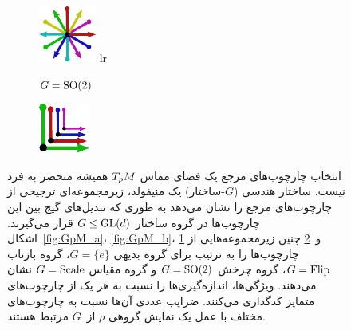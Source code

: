 \begin{figure}[htbp]
\begin{subfigure}[b]{0.24\textwidth}
		\includegraphics[width=0.8\linewidth]{figures/GpM_SO2.pdf}
		lr{\caption{\small $G=\operatorname{SO}(2)$}}
		\label{fig:GpM_c}
	\end{subfigure}
	\hspace*{.5em}
	\begin{subfigure}[b]{0.24\textwidth}
		\centering
		\includegraphics[width=0.8\linewidth]{figures/GpM_scale.pdf}
		\label{fig:GpM_d}
	\end{subfigure}
	
	\caption{
		انتخاب چارچوب‌های مرجع یک فضای مماس $T_p M$ همیشه منحصر به فرد نیست.
		ساختار هندسی ($G$-ساختار) یک منیفولد، زیرمجموعه‌ای ترجیحی از چارچوب‌های مرجع را نشان می‌دهد به طوری که تبدیل‌های گیج بین این چارچوب‌ها در گروه ساختار $G\leq\operatorname{GL}(d)$ قرار می‌گیرند.
		اشکال~\ref{fig:GpM_a}، \ref{fig:GpM_b}، \ref{fig:GpM_c} و~\ref{fig:GpM_d}
		چنین زیرمجموعه‌هایی از چارچوب‌ها را به ترتیب برای گروه بدیهی $G=\{e\}$، گروه بازتاب $G=\text{Flip}$، گروه چرخش $G=\operatorname{SO}(2)$ و گروه مقیاس $G=\text{Scale}$ نشان می‌دهند.
		ویژگی‌ها، اندازه‌گیری‌ها را نسبت به هر یک از چارچوب‌های متمایز کدگذاری می‌کنند.
		ضرایب عددی آن‌ها نسبت به چارچوب‌های مختلف با عمل یک نمایش گروهی $\rho$ از~$G$ مرتبط هستند.
	}
	\label{fig:GpM_examples}
\end{figure}


